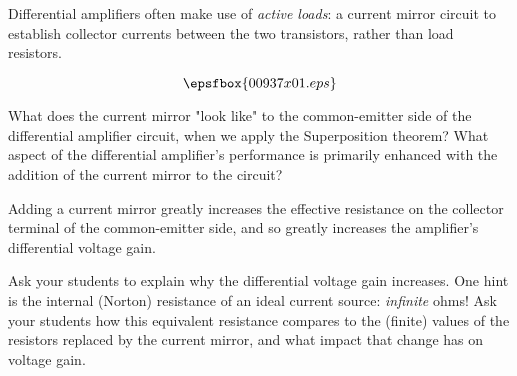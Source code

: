 

Differential amplifiers often make use of {\it active loads}: a current mirror circuit to establish collector currents between the two transistors, rather than load resistors.

$$\epsfbox{00937x01.eps}$$

What does the current mirror "look like" to the common-emitter side of the differential amplifier circuit, when we apply the Superposition theorem?  What aspect of the differential amplifier's performance is primarily enhanced with the addition of the current mirror to the circuit?







Adding a current mirror greatly increases the effective resistance on the collector terminal of the common-emitter side, and so greatly increases the amplifier's differential voltage gain.







Ask your students to explain why the differential voltage gain increases.  One hint is the internal (Norton) resistance of an ideal current source: {\it infinite} ohms!  Ask your students how this equivalent resistance compares to the (finite) values of the resistors replaced by the current mirror, and what impact that change has on voltage gain.




